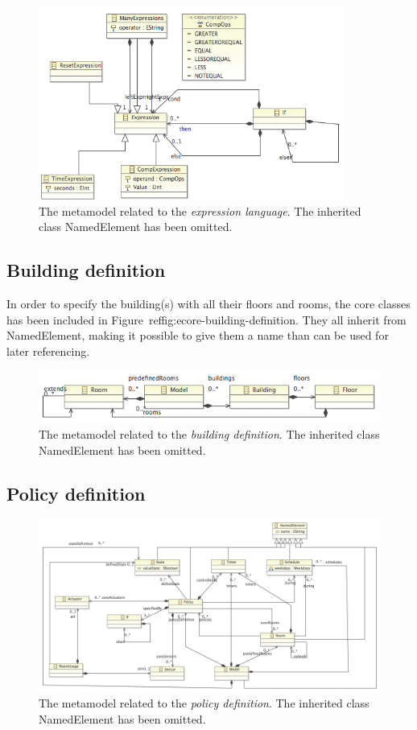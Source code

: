 \documentclass{llncs}
\begin{document}
\begin{figure}[h]
  \centering
    \includegraphics[width=10cm]{ecore-expression-language.png} 
	\caption{The metamodel related to the \textit{expression language}. The inherited class NamedElement has been omitted.}
	\label{fig:ecore-expression-language}
\end{figure}

\pagebreak
\subsection{Building definition}
In order to specify the building(s) with all their floors and rooms, the core classes has been included in Figure ref{fig:ecore-building-definition}. They all inherit from NamedElement, making it possible to give them a name than can be used for later referencing.
\begin{figure}
  \centering \includegraphics[scale=0.4]{ecore-building-definition.png}  
	\caption{The metamodel related to the \textit{building definition}. The inherited class NamedElement has been omitted.}
	\label{fig:ecore-building-definition}
\end{figure}

\subsection{Policy definition}

\begin{figure}
  \centering
    \includegraphics[scale=0.3]{ecore-policy-definition.png}	
	\caption{The metamodel related to the \textit{policy definition}. The inherited class NamedElement has been omitted.}
	\label{fig:ecore-policy-definition}
\end{figure}
\end{document}
